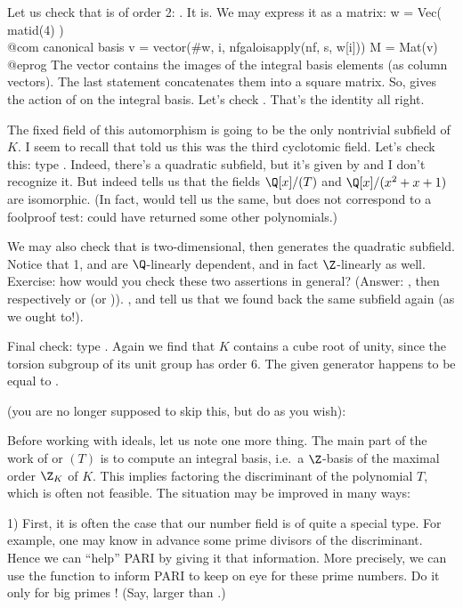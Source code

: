 Let us check that  is of order 2: . It is. We
may express it as a matrix:
\bprog
  w = Vec( matid(4) ) \\@com canonical basis
  v = vector(#w, i, nfgaloisapply(nf, s, w[i]))
  M = Mat(v)
@eprog\noindent
The vector  contains the images of the integral basis elements (as
column vectors). The last statement concatenates them into a square matrix.
So,  gives the action of  on the integral basis. Let's check
. That's the identity all right.

The fixed field of this automorphism is going to be the only nontrivial
subfield of $K$. I seem to recall that  told us this was the
third cyclotomic field. Let's check this: type . Indeed,
there's a quadratic subfield, but it's given by  and I don't recognize it. But  indeed tells
us that the fields $\Q[x]/(T)$ and $\Q[x]/(x^2+x+1)$ are isomorphic.
(In fact,  would tell us the same, but does not correspond to
a foolproof test:  could have returned some other polynomials.)

We may also check that  is two-dimensional, then  generates the quadratic subfield. Notice that 1,
 and  are $\Q$-linearly dependent, and in fact $\Z$-linearly as
well. Exercise: how would you check these two assertions in general? (Answer:
, then respectively  or  (or
)). ,  and 
tell us that we found back the same subfield again (as we ought to!).

Final check: type . Again we find that $K$ contains
a cube root of unity, since the torsion subgroup of its unit group
has order 6. The given generator happens to be equal to .

 (you are no longer supposed to skip this,
but do as you wish):

Before working with ideals, let us note one more thing. The main part of the
work of  or $(T)$ is to compute an integral basis,
i.e.~a $\Z$-basis of the maximal order $\Z_K$ of $K$. This implies factoring
the discriminant of the polynomial $T$, which is often not feasible. The
situation may be improved in many ways:

1) First, it is often the case that our number field is of quite a special
type. For example, one may know in advance some prime divisors of the
discriminant. Hence we can ``help'' PARI by giving it that information. More
precisely, we can use the function  to inform PARI to keep on
eye for these prime numbers. Do it only for big primes ! (Say, larger than
.)

